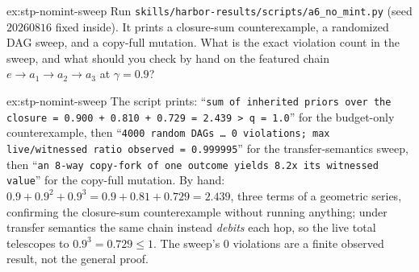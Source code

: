 \documentclass[11pt,a4paper]{article}
\theoremstyle{definition}
\begin{document}
\begin{pdexercise}[kind=Trace,rating=2]{ex:stp-nomint-sweep}
Run \texttt{skills/harbor-results/scripts/a6\_no\_mint.py} (seed $20260816$
fixed inside). It prints a closure-sum counterexample, a randomized DAG sweep,
and a copy-full mutation. What is the exact violation count in the sweep, and
what should you check by hand on the featured chain $e\to a_1\to a_2\to a_3$
at $\gamma=0.9$?
\end{pdexercise}
\begin{pdsolution}{ex:stp-nomint-sweep}
The script prints: ``\texttt{sum of inherited priors over the closure = 0.900
+ 0.810 + 0.729 = 2.439 > q = 1.0}'' for the budget-only counterexample, then
``\texttt{4000 random DAGs \dots{} 0 violations; max live/witnessed ratio
observed = 0.999995}'' for the transfer-semantics sweep, then ``\texttt{an
8-way copy-fork of one outcome yields 8.2x its witnessed value}'' for the
copy-full mutation. By hand: $0.9+0.9^2+0.9^3=0.9+0.81+0.729=2.439$, three
terms of a geometric series, confirming the closure-sum counterexample without
running anything; under transfer semantics the same chain instead \emph{debits}
each hop, so the live total telescopes to $0.9^3=0.729\le 1$.
The sweep's $0$ violations are a finite observed result, not the general proof.
\end{pdsolution}

\end{document}
